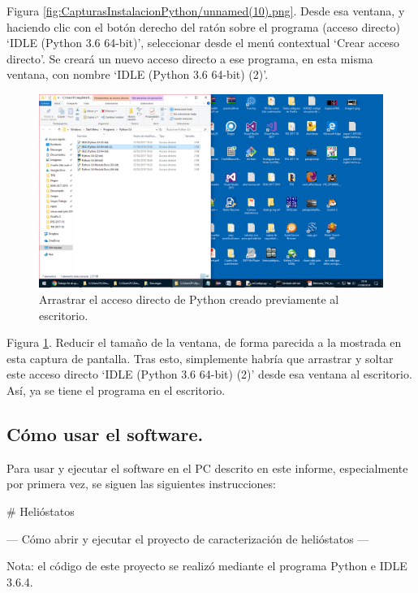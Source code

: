 Figura \ref{fig:CapturasInstalacionPython/unnamed(10).png}. Desde esa ventana, y haciendo clic con el botón derecho del ratón sobre el programa (acceso directo) ‘IDLE (Python 3.6 64-bit)’, seleccionar desde el menú contextual ‘Crear acceso directo’. Se creará un nuevo acceso directo a ese programa, en esta misma ventana, con nombre ‘IDLE (Python 3.6 64-bit) (2)’.\\[20pt]

\begin{figure}[h!]
  	\centering
	\includegraphics[width=\textwidth]{CapturasInstalacionPython/unnamed(11).png}
	\caption{Arrastrar el acceso directo de Python creado previamente al escritorio.
	\label{fig:CapturasInstalacionPython/unnamed(11).png}}
\end{figure}

Figura \ref{fig:CapturasInstalacionPython/unnamed(11).png}. Reducir el tamaño de la ventana, de forma parecida a la mostrada en esta captura de pantalla. Tras esto, simplemente habría que arrastrar y soltar este acceso directo ‘IDLE (Python 3.6 64-bit) (2)’ desde esa ventana al escritorio. Así, ya se tiene el programa en el escritorio.\\[20pt]

\subsection{Cómo usar el software.}

Para usar y ejecutar el software en el PC descrito en este informe, especialmente por primera vez, se siguen las siguientes instrucciones:

\# Helióstatos

--- Cómo abrir y ejecutar el proyecto de caracterización de helióstatos ---

Nota: el código de este proyecto se realizó mediante el programa Python e IDLE 3.6.4.

